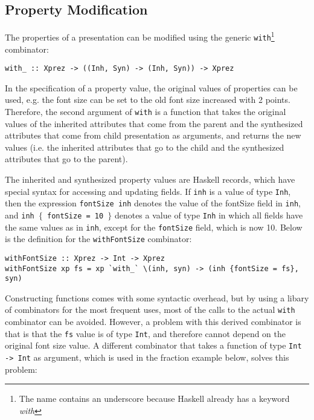 %									
\subsection{Property Modification}

The properties of a presentation can be modified using the generic \texttt{with}\footnote{The name contains an underscore because Haskell already has a keyword {\em with}} combinator:

\begin{small}
\begin{verbatim}
with_ :: Xprez -> ((Inh, Syn) -> (Inh, Syn)) -> Xprez
\end{verbatim}
\end{small}

In the specification of a property value, the original values of properties can be used, e.g. the font size can be set to the old font size increased with 2 points. Therefore, the second argument of \texttt{with} is a function that takes the original values of the inherited attributes that come from the parent and the synthesized attributes that come from child presentation as arguments, and returns the new values (i.e. the inherited attributes that go to the child and the synthesized attributes that go to the parent).

The inherited and synthesized property values are Haskell records, which have special syntax for accessing and updating fields. If \texttt{inh} is a value of type \texttt{Inh}, then the expression \texttt{fontSize inh} denotes the value of the fontSize field in \texttt{inh}, and \texttt{inh $\{$ fontSize = 10 $\}$} denotes a value of type \texttt{Inh} in which all fields have the same values as in \texttt{inh}, except for the \texttt{fontSize} field, which is now 10. Below is the definition for the \texttt{withFontSize} combinator: 

\begin{small}
\begin{verbatim}
withFontSize :: Xprez -> Int -> Xprez
withFontSize xp fs = xp `with_` \(inh, syn) -> (inh {fontSize = fs}, syn)
\end{verbatim}
\end{small}

Constructing functions comes with some syntactic overhead, but by using a libary of combinators for the most frequent uses, most of the calls to the actual \texttt{with} combinator can be avoided. However, a problem with this derived combinator is that is that the \texttt{fs} value is of type \texttt{Int}, and therefore cannot depend on the original font size value. A different combinator that takes a function of type \texttt{Int -> Int} as argument, which is used in the fraction example below, solves this problem:

